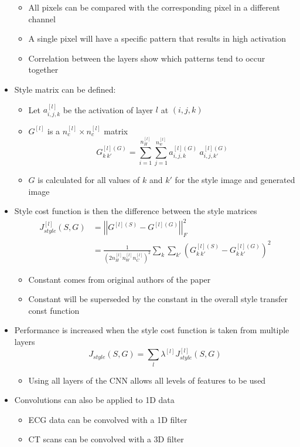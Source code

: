 \documentclass[12pt, letterpaper]{article}
\begin{document}
\begin{itemize}
        \begin{itemize}
            \item All pixels can be compared with the corresponding pixel in a different channel
            \item A single pixel will have a specific pattern that results in high activation
            \item Correlation between the layers show which patterns tend to occur together
        \end{itemize}
        \item Style matrix can be defined:
        \begin{itemize}
            \item Let $a_{i,j,k}^{[l]}$ be the activation of layer $l$ at $(i,j,k)$
            \item $G^{[l]}$ is a $n_c^{[l]}\times n_c^{[l]}$ matrix 
            $$G^{[l](G)}_{k~k'}=\sum_{i=1}^{n_H^{[l]}}\sum_{j=1}^{n_w^{[l]}}a^{[l](G)}_{i,j,k}~a^{[l](G)}_{i,j,k'}$$
            \item $G$ is calculated for all values of $k$ and $k'$ for the style image and generated image
        \end{itemize}
        \item Style cost function is then the difference between the style matrices
        \begin{align*}
            J_{style}^{[l]}(S,G)&=\left|\left|G^{[l](S)}-G^{[l](G)}\right|\right|^2_F \\
            &=\frac{1}{\left(2n_H^{[l]}n_W^{[l]}n_C^{[l]}\right)^2}\sum_k\sum_{k'}\left(G_{k~k'}^{[l](S)}-G_{k~k'}^{[l](G)}\right)^2
        \end{align*}
        \begin{itemize}
            \item Constant comes from original authors of the paper
            \item Constant will be superseded by the constant in the overall style transfer const function
        \end{itemize}
        \item Performance is increased when the style cost function is taken from multiple layers
        $$J_{style}(S,G)=\sum_l\lambda^{[l]}J_{style}^{[l]}(S,G)$$
        \begin{itemize}
            \item Using all layers of the CNN allows all levels of features to be used
        \end{itemize}
        \item Convolutions can also be applied to 1D data
        \begin{itemize}
            \item ECG data can be convolved with a 1D filter
            \item CT scans can be convolved with a 3D filter
        \end{itemize}
    \end{itemize}
    \pagebreak
\end{document}
